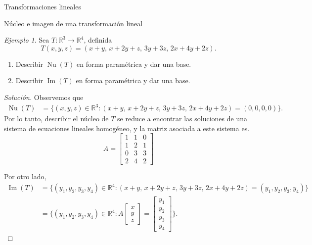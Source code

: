 \documentclass[a4paper,12pt,twoside,spanish,reqno]{amsbook}
\numberwithin{equation}{section}
\theoremstyle{definition}
\theoremstyle{remark}
\newtheorem*{ejemplo*}{Ejemplo}
\newcommand{\img}{\operatorname{Im}}
\newcommand{\nuc}{\operatorname{Nu}}
\newcommand{\R}{\mathbb R}
\begin{document}
\begin{chapter}{Transformaciones lineales}
\begin{section}{Núcleo e imagen de una transformación lineal}
        \begin{ejemplo*}
        Sea $T: \R^3 \to \R^4$, definida
        $$
        T(x,y,z) = (x +y ,\,x +2y +z,\,3y +3z,\,2x +4y +2z).
        $$
        \begin{enumerate}
            \item Describir $\nuc(T)$  en forma paramétrica y dar una base.
            \item Describir $\img(T)$  en forma paramétrica y  dar una base. 
        \end{enumerate}
        \begin{proof}[Solución] 
        Observemos que 
        \begin{align*}
        \nuc(T) &= \{(x,y,z)\in \R^3: (x +y ,\,x +2y +z,\,3y +3z,\,2x +4y +2z) =(0,0,0,0)\}.
        \end{align*}
        Por  lo tanto, describir el núcleo de $T$ se reduce a encontrar las soluciones de una sistema de ecuaciones lineales homogéneo, y la matriz asociada a este sistema es.   
        \begin{equation*}
        A = \begin{bmatrix}
        1&1&0\\1&2&1\\0&3&3\\2&4&2
        \end{bmatrix}
        \end{equation*}
        
        Por  otro lado,
        \begin{align*}
        \img(T) &= \{(y_1,y_2,y_3,y_4)\in \R^4: (x +y ,\,x +2y +z,\,3y +3z,\,2x +4y +2z) =(y_1,y_2,y_3,y_4)\}\\
        &=  \{(y_1,y_2,y_3,y_4)\in \R^4: A\begin{bmatrix}x\\y\\z	\end{bmatrix}  =
        \begin{bmatrix}y_1\\y_2\\y_3\\y_4\end{bmatrix}\}.
        \end{align*}
        

\end{proof}
\end{ejemplo*}
\end{section}
\end{chapter}
\end{document}

